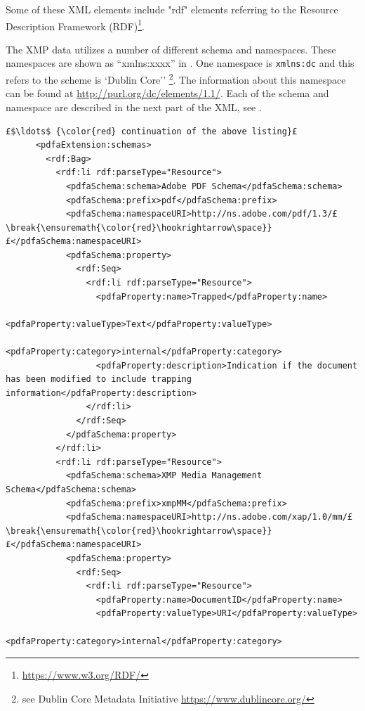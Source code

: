 Some of these XML elements include "rdf" elements referring to the Resource Description Framework (RDF)\footnote{\url{https://www.w3.org/RDF/}}.

The XMP data utilizes a number of different schema and namespaces. These namespaces are shown as ``xmlns:xxxx''  in . One namespace is \texttt{xmlns:dc} and this refers to the scheme is `Dublin Core'' \footnote{see Dublin Core Metadata Initiative \url{https://www.dublincore.org/}}. The information about this namespace can be found at \url{http://purl.org/dc/elements/1.1/}. Each of the schema and namespace are described in the next part of the XML, see .

\begin{lstlisting}[style=myXML,
caption={Second part of the XML metadata embedded in a PDF file (some reformatting has been done to fit the text in the boarders)}, label={lst:pdfinfoOutputPart2}]
£$\ldots$ {\color{red} continuation of the above listing}£ 
      <pdfaExtension:schemas>
        <rdf:Bag>
          <rdf:li rdf:parseType="Resource">
            <pdfaSchema:schema>Adobe PDF Schema</pdfaSchema:schema>
            <pdfaSchema:prefix>pdf</pdfaSchema:prefix>
            <pdfaSchema:namespaceURI>http://ns.adobe.com/pdf/1.3/£\break{\ensuremath{\color{red}\hookrightarrow\space}}£</pdfaSchema:namespaceURI>
            <pdfaSchema:property>
              <rdf:Seq>
                <rdf:li rdf:parseType="Resource">
                  <pdfaProperty:name>Trapped</pdfaProperty:name>
                  <pdfaProperty:valueType>Text</pdfaProperty:valueType>
                  <pdfaProperty:category>internal</pdfaProperty:category>
                  <pdfaProperty:description>Indication if the document has been modified to include trapping information</pdfaProperty:description>
                </rdf:li>
              </rdf:Seq>
            </pdfaSchema:property>
          </rdf:li>
          <rdf:li rdf:parseType="Resource">
            <pdfaSchema:schema>XMP Media Management Schema</pdfaSchema:schema>
            <pdfaSchema:prefix>xmpMM</pdfaSchema:prefix>
            <pdfaSchema:namespaceURI>http://ns.adobe.com/xap/1.0/mm/£\break{\ensuremath{\color{red}\hookrightarrow\space}}£</pdfaSchema:namespaceURI>
            <pdfaSchema:property>
              <rdf:Seq>
                <rdf:li rdf:parseType="Resource">
                  <pdfaProperty:name>DocumentID</pdfaProperty:name>
                  <pdfaProperty:valueType>URI</pdfaProperty:valueType>
                  <pdfaProperty:category>internal</pdfaProperty:category>

\end{lstlisting}

